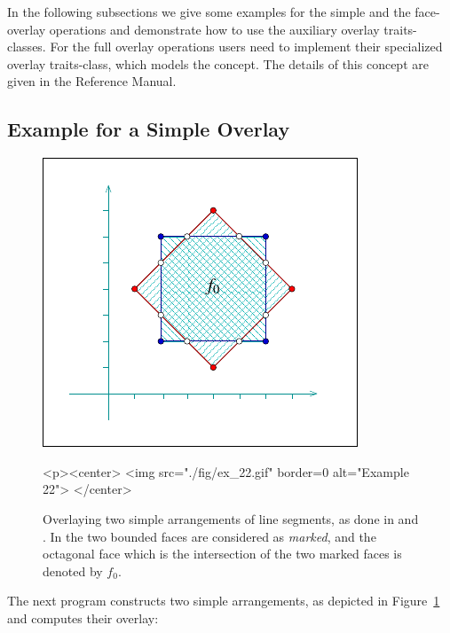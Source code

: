 In the following subsections we give some examples for the simple and the
face-overlay operations and demonstrate how to use the auxiliary overlay
traits-classes. For the full overlay operations users need to implement
their specialized overlay traits-class, which models the 
concept. The details of this concept are given in the Reference Manual.

\subsection{Example for a Simple Overlay\label{arr_ssec:simp_ovl}}

\begin{figure}[t]
\begin{ccTexOnly}
  \begin{center}
  \includegraphics{Arrangement_2/fig/ex_22}
  \end{center}
\end{ccTexOnly}
\begin{ccHtmlOnly}
  <p><center>
  <img src="./fig/ex_22.gif" border=0 alt="Example 22">
  </center>
\end{ccHtmlOnly}
\caption{Overlaying two simple arrangements of line segments, as done
in  and .
In  the two bounded faces are
considered as {\em marked}, and the octagonal face which is the intersection
of the two marked faces is denoted by $f_0$.\label{arr_fig:ex_22}}
\end{figure}

The next program constructs two simple arrangements, as depicted in
Figure~\ref{arr_fig:ex_22} and computes their overlay:

